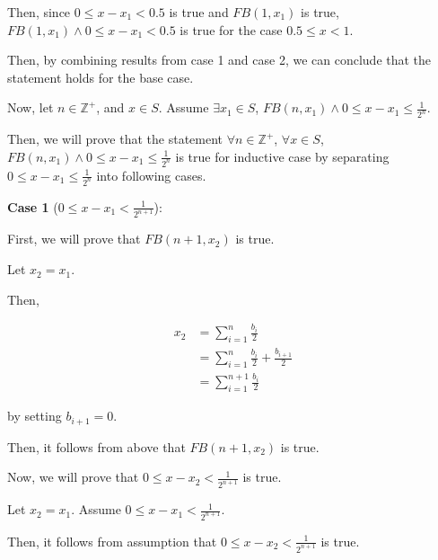 \documentclass[12pt]{article}
\begin{document}
\begin{enumerate}[a.]
    Then, since $0 \leq x - x_1 < 0.5$ is true and $FB(1,x_1)$ is true, $FB(1,x_1) \land
    0 \leq x - x_1 < 0.5$ is true for the case $0.5 \leq x < 1$.

    \bigskip

    Then, by combining results from case 1 and case 2, we can conclude that the
    statement holds for the base case.

    \bigskip

    Now, let $n \in \mathbb{Z}^{+}$, and $x \in S$. Assume $\exists x_1 \in S$,
    $FB(n, x_1) \land 0 \leq x - x_1 \leq \frac{1}{2^n}$.


    Then, we will prove that the statement $\forall n \in \mathbb{Z}^{+}$, $\forall x
    \in S$, $FB(n,x_1) \land 0 \leq x - x_1 \leq \frac{1}{2^n}$ is true for inductive
    case by separating $0 \leq x - x_1 \leq \frac{1}{2^n}$ into following cases.

    \bigskip

    \textbf{Case 1} ($0 \leq x - x_1 < \frac{1}{2^{n+1}}$):

    \bigskip

    First, we will prove that $FB(n+1,x_2)$ is true.

    \bigskip

    Let $x_2 = x_1$.

    \bigskip

    Then,

    \begin{align}
        x_2 &= \sum\limits_{i=1}^n \frac{b_i}{2}\\
        &= \sum\limits_{i=1}^n \frac{b_i}{2} + \frac{b_{i+1}}{2}\\
        &= \sum\limits_{i=1}^{n+1} \frac{b_i}{2}
    \end{align}

    by setting $b_{i+1} = 0$.

    \bigskip

    Then, it follows from above that $FB(n+1, x_2)$ is true.

    \bigskip

    Now, we will prove that $0 \leq x - x_2 < \frac{1}{2^{n+1}}$ is true.

    \bigskip

    Let $x_2 = x_1$. Assume $0 \leq x - x_1 < \frac{1}{2^{n+1}}$.

    \bigskip

    Then, it follows from assumption that $0 \leq x - x_2 < \frac{1}{2^{n+1}}$ is
    true.


\end{enumerate}
\end{document}
